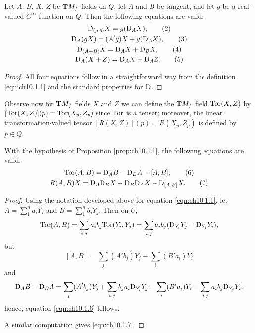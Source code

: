 \documentclass[../main]{subfiles}
\begin{document}
\begin{proposition} \label{prop:ch10.1.1}
Let $A$, $B$, $X$, $Z$ be $\mathbf{T}M_f$ fields on $Q$, let $A$ and $B$ be tangent, and let $g$ be a real-valued $C^\infty$ function on $Q$. Then the following equations are valid:
    \begin{gather}
    \mathrm{D}_{(gA)} X = g(\mathrm{D}_A X),
    \label{eqn:ch10.1.2}\tag{2} \\
    \mathrm{D}_A(gX) = (A'g)X + g(\mathrm{D}_A X),
    \label{eqn:ch10.1.3}\tag{3} \\
    \mathrm{D}_{(A+B)} X = \mathrm{D}_A X + \mathrm{D}_B X,
    \label{eqn:ch10.1.4}\tag{4}\\
    \mathrm{D}_A(X+Z) = \mathrm{D}_A X + \mathrm{D}_A Z.\tag{5}
    \label{eqn:ch10.1.5}
    \end{gather}
\end{proposition}

\begin{proof}
All four equations follow in a straightforward way from the definition \eqref{eqn:ch10.1.1} and the standard properties for $\mathrm{D}$.
\end{proof}

Observe now for $\mathbf{T}M_f$ fields $X$ and $Z$ we can define the $\mathbf{T}M_f$ field $\mathrm{Tor}(X,Z)$ by $[\mathrm{Tor}(X,Z)](p)=\mathrm{Tor}(X_p,Z_p)$ since $\mathrm{Tor}$ is a tensor; moreover, the linear transformation-valued tensor $[R(X,Z)](p)=R(X_p,Z_p)$ is defined by $p\in Q$.



\begin{proposition} \label{prop:ch10.1.2}
With the hypothesis of Proposition \eqref{prop:ch10.1.1}, the following equations are valid:
    \begin{gather}
    \mathrm{Tor}(A,B) = \mathrm{D}_A B - \mathrm{D}_B A - [A,B],
    \label{eqn:ch10.1.6}\tag{6} \\
    R(A,B)X = \mathrm{D}_A \mathrm{D}_B X - \mathrm{D}_B \mathrm{D}_A X - \mathrm{D}_{[A,B]}X.
    \label{eqn:ch10.1.7}\tag{7}
    \end{gather}
\end{proposition}

\begin{proof}
Using the notation developed above for equation \eqref{eqn:ch10.1.1}, let $A=\displaystyle\sum_1^n a_iY_i$ and $B=\displaystyle\sum_1^n b_jY_j$. Then on $U$,
\[
\mathrm{Tor}(A,B)
=
\sum_{i,j} a_ib_j \mathrm{Tor}(Y_i,Y_j)
=
\sum_{i,j} a_ib_j (\mathrm{D}_{Y_i} Y_j - \mathrm{D}_{Y_j} Y_i),
\]
but
\[
[A,B]
=
\sum_j (A' b_j) Y_j - \sum_i (B' a_i) Y_i
\]
and
\[
\mathrm{D}_A B - \mathrm{D}_B A
=
\sum_j (A' b_j) Y_j
    + \sum_{i,j} b_j a_i \mathrm{D}_{Y_i} Y_j
    - \sum_i (B' a_i) Y_i
    - \sum_{i,j} a_i b_j \mathrm{D}_{Y_j} Y_i;
\]
hence, equation \eqref{eqn:ch10.1.6} follows.

A similar computation gives \eqref{eqn:ch10.1.7}.
\end{proof}
\end{document}
